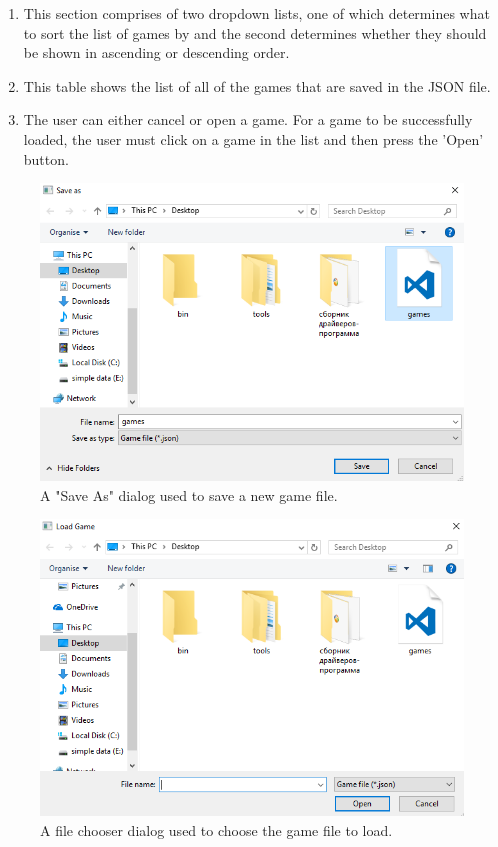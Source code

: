\begin{enumerate}[label=(\Alph*)]
	\item This section comprises of two dropdown lists, one of which determines what to sort the list of games by and the second determines whether they should be shown in ascending or descending order.
	\item This table shows the list of all of the games that are saved in the JSON file.
	\item The user can either cancel or open a game. For a game to be successfully loaded, the user must click on a game in the list and then press the 'Open' button.
\end{enumerate}
\begin{figure}[H]
\centering
	\includegraphics[width=1.0\textwidth]{images/screenshots/save-as-dialog}
	\caption{A "Save As" dialog used to save a new game file.}
\end{figure}
\begin{figure}[H]
\centering
	\includegraphics[width=1.0\textwidth]{images/screenshots/load-file-dialog}
	\caption{A file chooser dialog used to choose the game file to load.}
\end{figure}